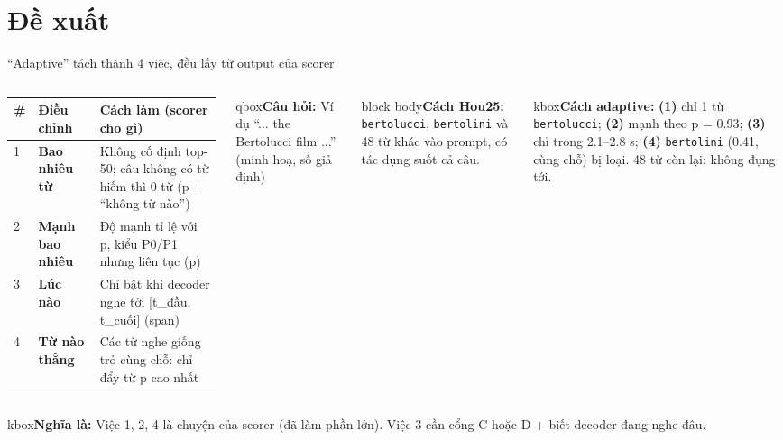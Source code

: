 \documentclass[aspectratio=169,xcolor=table]{beamer}
\newcommand{\bsz}{\footnotesize}%
\newcommand{\nbox}[2][block body]{\begin{beamercolorbox}[sep=0.45em,rounded=true]{#1}\bsz #2\end{beamercolorbox}}
\newcommand{\cauhoi}[1]{\begin{beamercolorbox}[sep=0.30em,rounded=true]{qbox}\bsz\textbf{Câu hỏi:} #1\end{beamercolorbox}\vspace{0.08cm}}
\newcommand{\nghiala}[1]{\begin{beamercolorbox}[sep=0.32em,rounded=true]{kbox}\bsz\textbf{Nghĩa là:} #1\end{beamercolorbox}}
\begin{document}
\section{Đề xuất}
\begin{frame}{``Adaptive'' tách thành 4 việc, đều lấy từ output của scorer}
\begin{columns}[T]
\renewcommand{\arraystretch}{1.08}\footnotesize
\begin{tabular}{C{0.3cm}L{2.0cm}L{4.2cm}}
\toprule
\# & Điều chỉnh & Cách làm (scorer cho gì) \\
 & \textbf{Bao nhiêu từ} & Không cố định top-50; câu không có từ hiếm thì 0 từ (p + ``không từ nào'') \\
2 & \textbf{Mạnh bao nhiêu} & Độ mạnh tỉ lệ với p, kiểu P0/P1 nhưng liên tục (p) \\
3 & \textbf{Lúc nào} & Chỉ bật khi decoder nghe tới [t\_đầu, t\_cuối] (span) \\
4 & \textbf{Từ nào thắng} & Các từ nghe giống trỏ cùng chỗ: chỉ đẩy từ p cao nhất \\
\bottomrule
\end{tabular}
\cauhoi{Ví dụ ``... the Bertolucci film ...'' (minh hoạ, số giả định)}
\nbox{\textbf{Cách Hou25:} \texttt{bertolucci}, \texttt{bertolini} và 48 từ khác vào prompt, có tác dụng suốt cả câu.}
\vspace{0.06cm}
\nbox[kbox]{\textbf{Cách adaptive:} \textbf{(1)} chỉ 1 từ \texttt{bertolucci}; \textbf{(2)} mạnh theo p = 0.93; \textbf{(3)} chỉ trong 2.1--2.8 s; \textbf{(4)} \texttt{bertolini} (0.41, cùng chỗ) bị loại. 48 từ còn lại: không đụng tới.}
\end{columns}
\vspace{0.1cm}
\nghiala{Việc 1, 2, 4 là chuyện của scorer (đã làm phần lớn). Việc 3 cần cổng C hoặc D + biết decoder đang nghe đâu.}
\end{frame}
\end{document}
